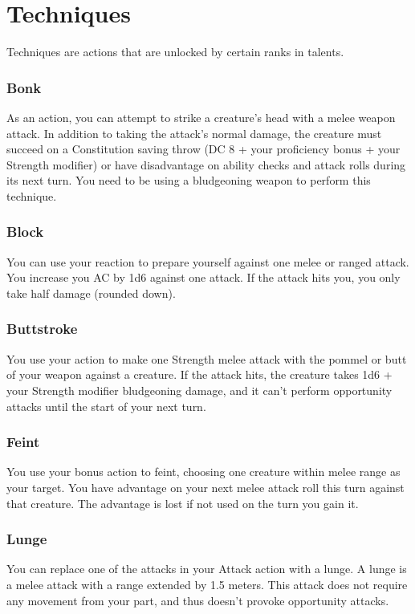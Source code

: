 \section{Techniques}
Techniques are actions that are unlocked by certain ranks in talents. %
\subsubsection{Bonk} \label{tec::bonk}
As an action, you can attempt to strike a creature's head with a melee weapon attack.
In addition to taking the attack's normal damage, the creature must succeed on a Constitution saving throw (DC 8 + your proficiency bonus + your Strength modifier) or have disadvantage on ability checks and attack rolls during its next turn.
You need to be using a bludgeoning weapon to perform this technique.

\subsubsection{Block} \label{tec::block}
You can use your reaction to prepare yourself against one melee or ranged attack.
You increase you AC by 1d6 against one attack.
If the attack hits you, you only take half damage (rounded down).

\subsubsection{Buttstroke} \label{tec::buttstroke}
You use your action to make one Strength melee attack with the pommel or butt of your weapon against a creature.
If the attack hits, the creature takes 1d6 + your Strength modifier bludgeoning damage, and it can't perform opportunity attacks until the start of your next turn.

\subsubsection{Feint} \label{tec::feint}
You use your bonus action to feint, choosing one creature within melee range as your target.
You have advantage on your next melee attack roll this turn against that creature.
The advantage is lost if not used on the turn you gain it.

\subsubsection{Lunge} \label{tec::lunge}
You can replace one of the attacks in your Attack action with a lunge.
A lunge is a melee attack with a range extended by 1.5 meters.
This attack does not require any movement from your part, and thus doesn't provoke opportunity attacks.

